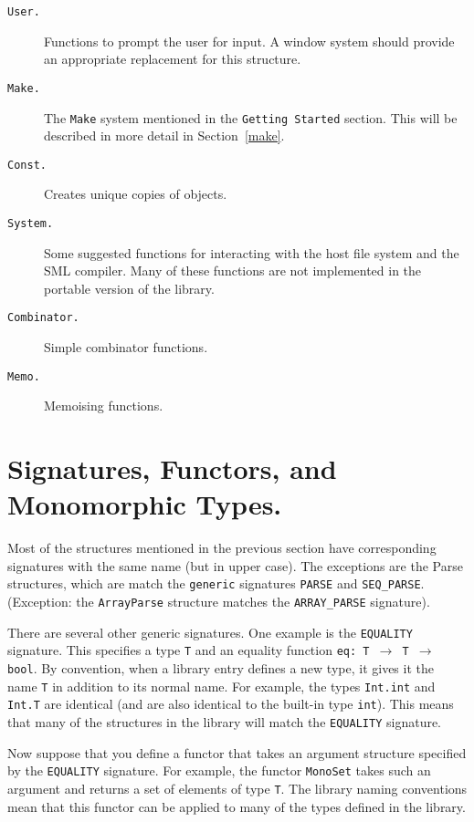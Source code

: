 \begin{description}
  \item[\tt User.]
	Functions to prompt the user for input.  A window system should
	provide an appropriate replacement for this structure.

  \item[\tt Make.]
	The {\tt Make} system mentioned in the {\tt Getting Started}
	section.  This will be described in more detail in
	Section~\ref{make}.

  \item[\tt Const.]
	Creates unique copies of objects.

  \item[\tt System.]
	Some suggested functions for interacting with the host file
	system and the SML compiler.  Many of these functions are not
        implemented in the portable version of the library.

  \item[\tt Combinator.]
	Simple combinator functions.

  \item[\tt Memo.]
	Memoising functions.
\end{description}



\section{Signatures, Functors, and Monomorphic Types.}	\label{generic}

Most of the structures mentioned in the previous section have
corresponding signatures with the same name (but in upper case).  The
exceptions are the Parse structures, which are match the {\tt generic}
signatures {\tt PARSE} and {\tt SEQ\_PARSE}.  (Exception: the
{\tt ArrayParse} structure matches the {\tt ARRAY\_PARSE} signature).

There are several other generic signatures.  One example is the
{\tt EQUALITY} signature.  This specifies a type {\tt T} and an equality
function {\tt eq: T $\rightarrow$ T $\rightarrow$ bool}.  By convention,
when a library entry defines a new type, it gives it the name {\tt T} in
addition to its normal name.  For example, the types {\tt Int.int} and
{\tt Int.T} are identical (and are also identical to the built-in type
{\tt int}).  This means that many of the structures in the library will
match the {\tt EQUALITY} signature.

Now suppose that you define a functor that 
takes an argument structure specified by the {\tt EQUALITY}
signature.  For example, the functor {\tt MonoSet} takes
such an argument and returns a set of elements of type {\tt T}.
The library naming conventions mean that this functor can
be applied to many of the types defined in the library.

